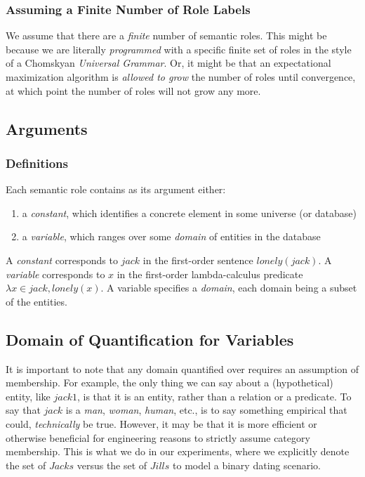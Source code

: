 \documentclass[12pt]{article}
\begin{document}
\subsubsection{Assuming a Finite Number of Role Labels}
We assume that there are a {\em finite} number of semantic roles.
This might be because we are literally {\em programmed} with a specific finite set of roles in the style of a Chomskyan {\em Universal Grammar}.
Or, it might be that an expectational maximization algorithm is {\em allowed to grow} the number of roles until convergence, at which point the number of roles will not grow any more.

\subsection{Arguments}
\subsubsection{Definitions}
Each semantic role contains as its argument either:
\begin{enumerate}
    \item a \emph{constant}, which identifies a concrete element in some universe (or database)
    \item a \emph{variable}, which ranges over some \emph{domain} of entities in the database
\end{enumerate}
A {\em constant} corresponds to $jack$ in the first-order sentence $lonely(jack)$.
A {\em variable} corresponds to $x$ in the first-order lambda-calculus predicate $\lambda x \in jack, lonely(x)$.
A variable specifies a \emph{domain}, each domain being a subset of the entities.

\subsection{Domain of Quantification for Variables}
It is important to note that any domain quantified over requires an assumption of membership.
For example, the only thing we can say about a (hypothetical) entity, like \( jack1 \), is that it is an entity, rather than a relation or a predicate.
To say that \( jack \) is a \emph{man}, \emph{woman}, \emph{human}, etc., is to say something empirical that could, \emph{technically} be true.
However, it may be that it is more efficient or otherwise beneficial for engineering reasons to strictly assume category membership.
This is what we do in our experiments, where we explicitly denote the set of \( Jacks \) versus the set of \( Jills \) to model a binary dating scenario.
\end{document}
